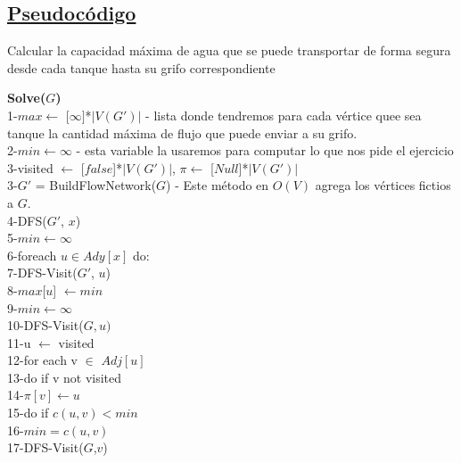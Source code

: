 \documentclass{article}
\begin{document}
    \subsection{\underline{Pseudoc\'odigo}}
    \begin{algorithm}
        \caption{Calcular la capacidad máxima de agua que se puede transportar de forma segura desde cada tanque hasta su grifo correspondiente}
        \textbf{Solve($G$)\\}
        1-\hspace*{1em}$max \leftarrow$ [$\infty]$*$|V(G')|$ - lista donde tendremos para cada v\'ertice quee sea tanque la cantidad m\'axima de flujo que puede enviar a su grifo.\\
        2-\hspace*{1em}$min \leftarrow \infty$ - esta variable la usaremos para computar lo que nos pide el ejercicio\\
        3-\hspace*{1em}visited $\leftarrow$ [$false$]*$|V(G')|$, $\pi \leftarrow$ [$Null$]*$|V(G')|$\\
        3-\hspace*{1em}$G'$ = Build\textunderscore Flow\textunderscore Network($G$) - Este m\'etodo en $O(V)$ agrega los v\'ertices fictios a $G$.\\
        4-\hspace*{1em}DFS($G'$, $x$)\\
        5-\hspace*{2em}$min \leftarrow \infty$\\
        6-\hspace*{2em}foreach $u \in Ady[x]$ do:\\
        7-\hspace*{3em}DFS-Visit($G'$, $u$)\\
        8-\hspace*{3em}$max$[$u$] $\leftarrow min$\\
        9-\hspace*{3em}$min \leftarrow \infty$\\

        10-\hspace*{1em}DFS-Visit($G,u)$\\ 
        11-\hspace*{2em}u $\leftarrow$ visited \\  
        12-\hspace*{2em}for each v $\in$ $Adj[u]$\\
        13-\hspace*{3em}do if v not visited\\
        14-\hspace*{4em}$\pi[v] \leftarrow u$\\
        15-\hspace*{4em}do if $c(u,v)< min$\\
        16-\hspace*{4em}$min=c(u,v)$\\
        17-\hspace*{4em}DFS-Visit($G$,$v$)\\
        

\end{algorithm}
\end{document}
